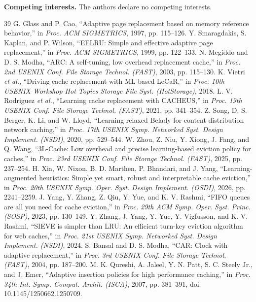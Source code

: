 \documentclass[10pt,twocolumn]{article}
\begin{document}
\textbf{Competing interests.} The authors declare no competing interests.

\begin{thebibliography}{39}
\footnotesize
\setlength{\itemsep}{0pt}
 G. Glass and P. Cao, ``Adaptive page replacement based on memory reference behavior,'' in \emph{Proc. ACM SIGMETRICS}, 1997, pp. 115--126.
 Y. Smaragdakis, S. Kaplan, and P. Wilson, ``EELRU: Simple and effective adaptive page replacement,'' in \emph{Proc. ACM SIGMETRICS}, 1999, pp. 122--133.
 N. Megiddo and D. S. Modha, ``ARC: A self-tuning, low overhead replacement cache,'' in \emph{Proc. 2nd USENIX Conf. File Storage Technol. (FAST)}, 2003, pp. 115--130.
 K. Vietri \emph{et al.}, ``Driving cache replacement with ML-based LeCaR,'' in \emph{Proc. 10th USENIX Workshop Hot Topics Storage File Syst. (HotStorage)}, 2018.
 L. V. Rodriguez \emph{et al.}, ``Learning cache replacement with CACHEUS,'' in \emph{Proc. 19th USENIX Conf. File Storage Technol. (FAST)}, 2021, pp. 341--354.
 Z. Song, D. S. Berger, K. Li, and W. Lloyd, ``Learning relaxed Belady for content distribution network caching,'' in \emph{Proc. 17th USENIX Symp. Networked Syst. Design Implement. (NSDI)}, 2020, pp. 529--544.
 W. Zhou, Z. Niu, Y. Xiong, J. Fang, and Q. Wang, ``3L-Cache: Low overhead and precise learning-based eviction policy for caches,'' in \emph{Proc. 23rd USENIX Conf. File Storage Technol. (FAST)}, 2025, pp. 237--254.
 H. Xia, W. Nixon, B. D. Marthen, P. Bhandari, and J. Yang, ``Learning-augmented heuristics: Simple yet smart, robust and interpretable cache eviction,'' in \emph{Proc. 20th USENIX Symp. Oper. Syst. Design Implement. (OSDI)}, 2026, pp. 2241--2259.
 J. Yang, Y. Zhang, Z. Qiu, Y. Yue, and K. V. Rashmi, ``FIFO queues are all you need for cache eviction,'' in \emph{Proc. 29th ACM Symp. Oper. Syst. Princ. (SOSP)}, 2023, pp. 130--149.
 Y. Zhang, J. Yang, Y. Yue, Y. Vigfusson, and K. V. Rashmi, ``SIEVE is simpler than LRU: An efficient turn-key eviction algorithm for web caches,'' in \emph{Proc. 21st USENIX Symp. Networked Syst. Design Implement. (NSDI)}, 2024.
 S. Bansal and D. S. Modha, ``CAR: Clock with adaptive replacement,'' in \emph{Proc. 3rd USENIX Conf. File Storage Technol. (FAST)}, 2004, pp. 187--200.
 M. K. Qureshi, A. Jaleel, Y. N. Patt, S. C. Steely Jr., and J. Emer, ``Adaptive insertion policies for high performance caching,'' in \emph{Proc. 34th Int. Symp. Comput. Archit. (ISCA)}, 2007, pp. 381--391, doi: 10.1145/1250662.1250709.

\end{thebibliography}
\end{document}
